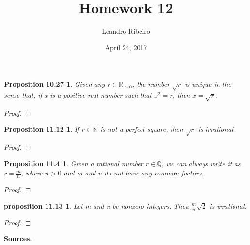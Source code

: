 \documentclass[12pt]{amsart}
\newcommand{\N}{\mathbb{N}}
\newcommand{\R}{\mathbb{R}}
\newcommand{\Q}{\mathbb{Q}}
\begin{document}
\title{Homework 12}
\date{April 24, 2017}
\author{Leandro Ribeiro}

\maketitle

\newtheorem*{prop10.27}{Proposition 10.27}
\begin{prop10.27}
	Given any $r \in \R_{>0}$, the number $\sqrt{r}$ is unique in the sense that, if x is a positive real number such that $x^2 = r$, then $x = \sqrt{r}$.
\end{prop10.27}

\begin{proof}
\end{proof}

\newtheorem*{prop11.12}{Proposition 11.12}

\begin{prop11.12}
	If $r \in \N$ is not a perfect square, then $\sqrt{r}$ is irrational.
\end{prop11.12}
\begin{proof}

\end{proof}

\newtheorem*{prop11.4}{Proposition 11.4}
\begin{prop11.4}
	Given a rational number $r \in \Q$, we can always write it as $r = \frac{m}{n}$, where $n > 0$ and m and n do not have any common factors.
\end{prop11.4}

\begin{proof}
\end{proof}

\newtheorem*{prop11.13}{proposition 11.13}
\begin{prop11.13}
	Let m and n be nonzero integers. Then $\frac{m}{n}\sqrt{2}$ is irrational.
\end{prop11.13}

\begin{proof}
\end{proof}

\textbf{Sources.}
\\
\end{document}
